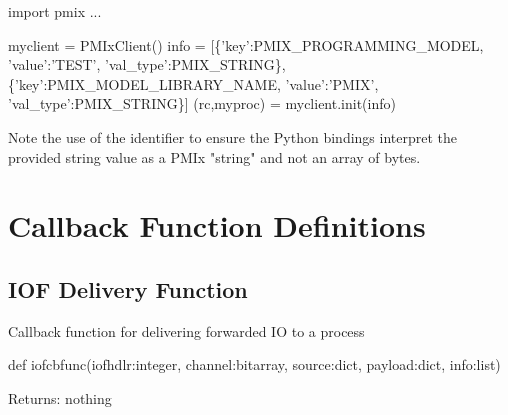 \pyspecificstart
\begin{codepar}
import pmix
...

myclient = PMIxClient()
info = [\{'key':PMIX_PROGRAMMING_MODEL,
          'value':'TEST', 'val_type':PMIX_STRING\},
        \{'key':PMIX_MODEL_LIBRARY_NAME,
          'value':'PMIX', 'val_type':PMIX_STRING\}]
(rc,myproc) = myclient.init(info)
\end{codepar}
\pyspecificend

Note the use of the  identifier to ensure the Python bindings interpret the provided string value as a \ac{PMIx} "string" and not an array of bytes.


\section{Callback Function Definitions}
\label{app:python:fns}

\subsection{IOF Delivery Function}

\summary

Callback function for delivering forwarded \ac{IO} to a process

\format

\pyspecificstart
\begin{codepar}
def iofcbfunc(iofhdlr:integer, channel:bitarray,
              source:dict, payload:dict, info:list)
\end{codepar}
\pyspecificend

\begin{arglist}
\end{arglist}

Returns: nothing

